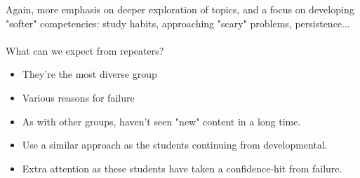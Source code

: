 \documentclass{ximera}
\begin{document}
Again, more emphasis on deeper exploration of topics, and a focus on developing
"softer" competencies: study habits, approaching "scary" problems, persistence...\\

\\ 

What can we expect from repeaters?\\
\begin{itemize}
\item They're the most diverse group
\item Various reasons for failure
\item As with other groups, haven't seen "new" content in a long time.
\item Use a similar approach as the students continuing from developmental.
\item Extra attention as these students have taken a confidence-hit from failure.
\end{itemize}
\end{document}
